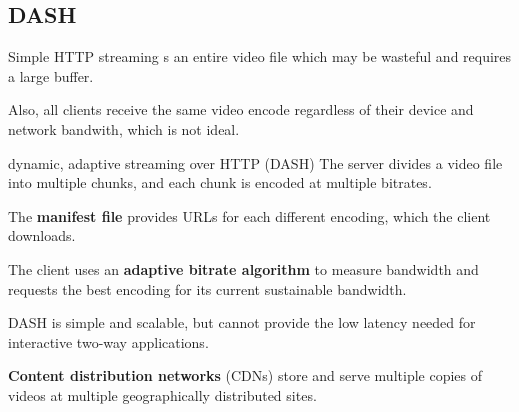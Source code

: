 \subsection{DASH}
Simple HTTP streaming s an entire video file which may be wasteful and requires a
large buffer.

Also, all clients receive the same video encode regardless of their device
and network bandwith, which is not ideal.

\begin{defn}{dynamic, adaptive streaming over HTTP (DASH)}
    The server divides a video file into multiple chunks, and each chunk is encoded at multiple bitrates.

    The \textbf{manifest file} provides URLs for each different encoding, which the client downloads.

    The client uses an \textbf{adaptive bitrate algorithm} to measure bandwidth and requests 
    the best encoding for its current sustainable bandwidth.
\end{defn}

DASH is simple and scalable, but cannot provide the low latency needed for interactive two-way applications.

\textbf{Content distribution networks} (CDNs) store and serve multiple copies of videos at multiple
geographically distributed sites.